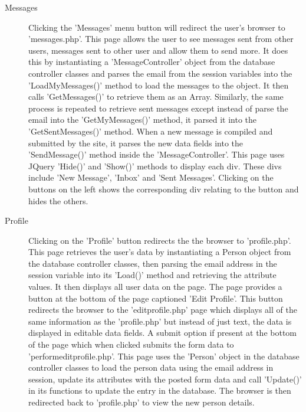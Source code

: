 \begin{description}
		\item[Messages] Clicking the 'Messages' menu button will redirect the user's browser to 'messages.php'. This page allows the user to see messages sent from other users, messages sent to other user and allow them to send more. It does this by instantiating a 'Message\textunderscore Controller' object from the database controller classes and parses the email from the session variables into the 'LoadMyMessages()' method to load the messages to the object. It then calls 'GetMessages()' to retrieve them as an Array. Similarly, the same process is repeated to retrieve sent messages except instead of parse the email into the 'GetMyMessages()' method, it parsed it into the 'GetSentMessages()' method. When a new message is compiled and submitted by the site, it parses the new data fields into the 'SendMessage()' method inside the 'Message\textunderscore Controller'. This page uses JQuery 'Hide()' and 'Show()' methods to display each div. These divs include 'New Message', 'Inbox' and 'Sent Messages'. Clicking on the buttons on the left shows the corresponding div relating to the button and hides the others.

		\item[Profile] Clicking on the 'Profile' button redirects the the browser to 'profile.php'. This page retrieves the user's data by instantiating a Person object from the database controller classes, then parsing the email address in the session variable into its 'Load()' method and retrieving the attribute values. It then displays all user data on the page. The page provides a button at the bottom of the page captioned 'Edit Profile'. This button redirects the browser to the 'edit\textunderscore profile.php' page which displays all of the same information as the 'profile.php' but instead of just text, the data is displayed in editable data fields. A submit option if present at the bottom of the page which when clicked submits the form data to 'perform\textunderscore edit\textunderscore profile.php'. This page uses the 'Person' object in the database controller classes to load the person data using the email address in session, update its attributes with the posted form data and call 'Update()' in its functions to update the entry in the database. The browser is then redirected back to 'profile.php' to view the new person details.


\end{description}

